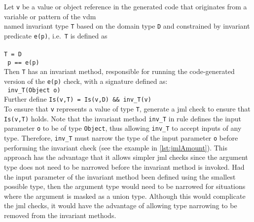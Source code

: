  { Let \texttt{v} be a
  value or object reference in the generated code that originates from
  a variable or pattern of the \ac{vdm}\\
  named invariant type \texttt{T} based on the domain type \texttt{D}
  and constrained
  by invariant predicate \texttt{e(p)}, i.e.\ \texttt{T} is defined as\\
  \\
  \texttt{T = D}\\
  \texttt{ p == e(p)}\\
  Then \texttt{T} has an invariant method, responsible for running the
  code-generated version of the \texttt{e(p)} check, with a signature
  defined as:\\
  \texttt{   inv\_T(Object o)}\\
  Further define
  \texttt{Is(v,T) = Is(v,D) \&\& inv\_T(v)}\\
  To ensure that \texttt{v} represents a value of type \texttt{T},
  generate a \ac{jml} check to ensure that \texttt{Is(v,T)} holds.}
%
%
Note that the invariant method \texttt{inv\_T} in rule
 defines the input parameter \texttt{o} to be of
type \texttt{Object}, thus allowing \texttt{inv\_T} to accept inputs
of any type. Therefore, \texttt{inv\_T} must narrow the type of the
input parameter \texttt{o} before performing the invariant check (see
the example in \autoref{lst:jmlAmount}). This approach has the
advantage that it allows simpler \ac{jml} checks since the argument
type does not need to be narrowed before the invariant method is
invoked. Had the input parameter of the invariant method been defined
using the smallest possible type, then the argument type would need to
be narrowed for situations where the argument is masked as a union
type. Although this would complicate the \ac{jml} checks, it would
have the advantage of allowing type narrowing to be removed from the
invariant methods.



